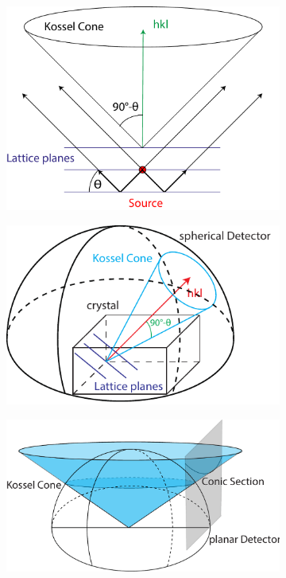 \begin{figure}
	\centering
	\begin{subfigure}[b]{0.25\textwidth}
	\includegraphics[width=\linewidth]{images/kossel0.pdf}
	\end{subfigure}
	\begin{subfigure}[b]{0.25\textwidth}
	\includegraphics[width=\linewidth]{images/kossel.pdf}
	\end{subfigure}
	\begin{subfigure}[b]{0.35\textwidth}
	\includegraphics[width=\linewidth]{images/kossel2.pdf}

\end{subfigure}
\end{figure}
